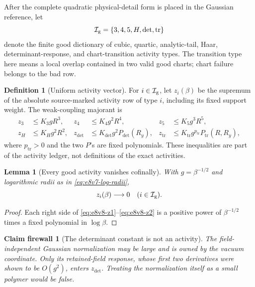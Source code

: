 \documentclass[11pt,oneside]{book}
\newtheorem{lemma}[theorem]{Lemma}
\newtheorem{firewall}[theorem]{Claim firewall}
\theoremstyle{definition}
\newtheorem{definition}[theorem]{Definition}
\theoremstyle{remark}
\begin{document}
After the complete quadratic physical-detail form is placed in the
Gaussian reference, let
\[
 {\mathcal I}_{\rm g}
 =\{3,4,5,H,\det,\operatorname{tr}\}                 \label{eq:e8v8-types}
\]
denote the finite good dictionary of cubic, quartic, analytic-tail,
Haar, determinant-response, and chart-transition activity types.
The transition type here means a local overlap contained in two valid
good charts; chart failure belongs to the bad row.

\begin{definition}[Uniform activity vector]
\label{def:e8v8-activity}
For \(i\in{\mathcal I}_{\rm g}\), let \(z_i(\beta)\) be the supremum
of the absolute source-marked activity row of type \(i\), including
its fixed support weight.  The weak-coupling majorant is
\begin{align}
 z_3&\le K_3gR^3,&
 z_4&\le K_4g^2R^4,&
 z_5&\le K_5g^3R^5,                                \label{eq:e8v8-z1}\\
 z_H&\le K_Hg^2R^2,&
 z_{\det}&\le K_{\det}g^2P_{\det}(R_y),&
 z_{\operatorname{tr}}&\le K_{\operatorname{tr}}
 g^{p_{\operatorname{tr}}}P_{\operatorname{tr}}(R,R_y), \label{eq:e8v8-z2}
\end{align}
where \(p_{\operatorname{tr}}>0\) and the two \(P\)'s are fixed
polynomials.  These inequalities are part of the activity ledger,
not definitions of the exact activities.
\end{definition}

\begin{lemma}[Every good activity vanishes cofinally]
\label{lem:e8v8-good-zero}
With \(g=\beta^{-1/2}\) and logarithmic radii as in
\eqref{eq:e8v7-log-radii},
\[
 z_i(\beta)\longrightarrow0
 \quad(i\in{\mathcal I}_{\rm g}).                    \label{eq:e8v8-good-zero}
\]
\end{lemma}

\begin{proof}
Each right side of
\eqref{eq:e8v8-z1}--\eqref{eq:e8v8-z2} is a positive power of
\(\beta^{-1/2}\) times a fixed polynomial in \(\log\beta\).
\end{proof}

\begin{firewall}[The determinant constant is not an activity]
\label{fire:e8v8-det-constant}
The field-independent Gaussian normalization may be large and is
owned by the vacuum coordinate.  Only its retained-field response,
whose first two derivatives were shown to be \(O(g^2)\), enters
\(z_{\det}\).  Treating the normalization itself as a small polymer
would be false.
\end{firewall}
\end{document}
